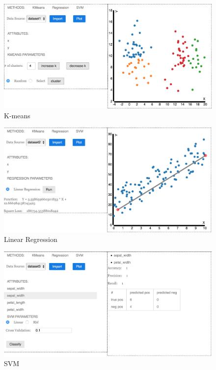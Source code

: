 \documentclass{article}
\begin{document}
\begin{figure}[h!]
	\centering
	\includegraphics[width=\textwidth]{figs/kmeans}
	\caption{K-means}
	\label{fig:kmeans}
\end{figure}
\begin{figure}[h!]
	\centering
	\includegraphics[width=\textwidth]{figs/linearregression}
	\caption{Linear Regression}
	\label{fig:regression}
\end{figure} 
\begin{figure}[h!]
	\centering
	\includegraphics[width=\textwidth]{figs/svm}
	\caption{SVM}
	\label{fig:svm}
\end{figure} 
\end{document}
